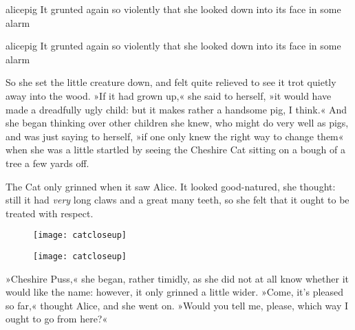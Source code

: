 \begin{pictures}
	\begin{letter}
		\begin{colorbigpic}
			[1.2]
			{alicepig}
			{It grunted again so violently that she looked down into its face in some alarm}
		\end{colorbigpic}
	\end{letter}
	
	\begin{a4}
		\begin{colorbigpic}
			[1.0]
			{alicepig}
			{It grunted again so violently that she looked down into its face in some alarm}
		\end{colorbigpic}
	\end{a4}	
\end{pictures}


So she set the little creature down, and felt quite relieved to see it trot quietly away into the wood. »If it had grown up,« she said to herself, »it would have made a dreadfully ugly child: but it makes rather a handsome pig, I think.« And she began thinking over other children she knew, who might do very well as pigs, and was just saying to herself, »if one only knew the right way to change them\longdash« when she was a little startled by seeing the Cheshire Cat sitting on a bough of a tree a few yards off.

The Cat only grinned when it saw Alice. It looked good-natured, she thought: still it had \textit{very} long claws and a great many teeth, so she felt that it ought to be treated with respect.



\begin{letter}
	\begin{figure}[tbh]
		\centering
		\texttt{[image: catcloseup]}
	\end{figure}

\end{letter}

\begin{a4}
	\begin{figure}[tbh]
		\centering
		\texttt{[image: catcloseup]}
	\end{figure}

\end{a4}

»Cheshire Puss,« she began, rather timidly, as she did not at all know whether it would like the name: however, it only grinned a little wider. »Come, it's pleased so far,« thought Alice, and she went on. »Would you tell me, please, which way I ought to go from here?«


